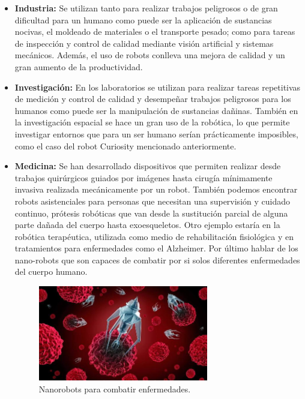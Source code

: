 \begin{itemize}
		\item \textbf{Industria: }Se utilizan tanto para realizar trabajos peligrosos o de gran dificultad para un humano como puede ser la aplicación de sustancias nocivas, el moldeado de materiales o el transporte pesado; como para tareas de inspección y control de calidad mediante visión artificial y sistemas mecánicos. Además, el uso de robots conlleva una mejora de calidad y un gran aumento de la productividad.
		\item \textbf{Investigación: }En los laboratorios se utilizan para realizar tareas repetitivas de medición y control de calidad y desempeñar trabajos peligrosos para los humanos como puede ser la manipulación de sustancias dañinas. También en la investigación espacial se hace un gran uso de la robótica, lo que permite investigar entornos que para un ser humano serían prácticamente imposibles, como el caso del robot Curiosity mencionado anteriormente.
		\item \textbf{Medicina: }Se han desarrollado dispositivos que permiten realizar desde trabajos quirúrgicos guiados por imágenes hasta cirugía mínimamente invasiva realizada mecánicamente por un robot. También podemos encontrar robots asistenciales para personas que necesitan una supervisión y cuidado continuo, prótesis robóticas que van desde la sustitución parcial de alguna parte dañada del cuerpo hasta exoesqueletos. Otro ejemplo estaría en la robótica terapéutica, utilizada como medio de rehabilitación fisiológica y en tratamientos para enfermedades como el Alzheimer. Por último hablar de los nano-robots que son capaces de combatir por si solos diferentes enfermedades del cuerpo humano.
		\begin{figure}[H]
			\begin{center}
				\includegraphics[width=0.7\textwidth]{imag/IMG13.jpeg}
					\caption{Nanorobots para combatir enfermedades.}
			\label{fig:Nanorobots.}	
			\end{center}
		\end{figure}	
			

\end{itemize}
